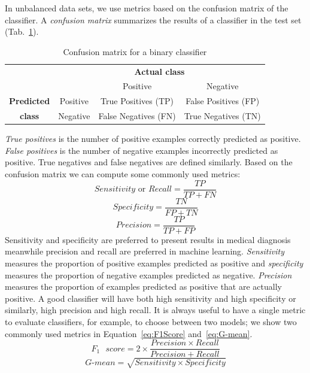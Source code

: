 In unbalanced data sets, we use metrics based on the confusion matrix of the classifier. A \emph{confusion matrix} summarizes the results of a classifier in the test set (Tab.~\ref{tab:ConfusionMatrix}).
\begin{table}[h]
	\centering
	\begin{tabular}{cc|c|c|}
		&\multicolumn{3}{c}{\textbf{Actual class}}\\
		&&Positive & Negative \\
		\cline{2-4}
		\textbf{Predicted}&Positive&True Positives (TP)& False Positives (FP)\\
		\cline{2-4}
		\textbf{class}&Negative&False Negatives (FN) & True Negatives (TN)\\
		\cline{2-4}
	\end{tabular}
	\caption{Confusion matrix for a binary classifier}
	\label{tab:ConfusionMatrix}
\end{table}
\emph{True positives} is the number of positive examples correctly predicted as positive. \emph{False positives} is the number of negative examples incorrectly predicted as positive. True negatives and false negatives are defined similarly. Based on the confusion matrix we can compute some commonly used metrics:
\begin{equation}
	Sensitivity \text{ or } Recall = \frac{TP}{TP+FN}
\end{equation}
\begin{equation}
	Specificity = \frac{TN}{FP+TN}
\end{equation}
\begin{equation}
	Precision = \frac{TP}{TP+FP}
\end{equation}
Sensitivity and specificity are preferred to present results in medical diagnosis meanwhile precision and recall are preferred in machine learning. \emph{Sensitivity} measures the proportion of positive examples predicted as positive and \emph{specificity} measures the proportion of negative examples predicted as negative. \emph{Precision} measures the proportion of examples predicted as positive that are actually positive. A good classifier will have both high sensitivity and high specificity or similarly, high precision and high recall. It is always useful to have a single metric to evaluate classifiers, for example, to choose between two models; we show two commonly used metrics in Equation~\ref{eq:F1Score} and~\ref{eq:G-mean}.
\begin{equation}
	F_1\text{ }score = 2\times\frac{Precision \times Recall}{Precision + Recall}
	\label{eq:F1Score}
\end{equation}
\begin{equation}
	G\text{-}mean = \sqrt{Sensitivity \times Specificity}
	\label{eq:G-mean}
\end{equation}

